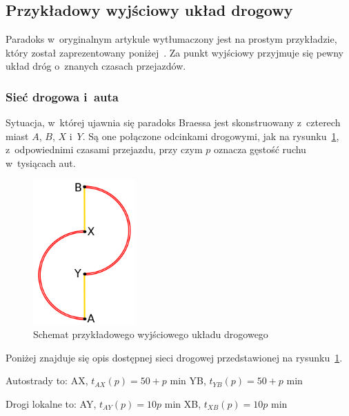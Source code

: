 \documentclass[twoside,12pt]{report}
\begin{document}
\subsection{Przykładowy wyjściowy układ drogowy}
Paradoks w~oryginalnym artykule wytłumaczony jest na prostym przykładzie, który został zaprezentowany poniżej~\cite{paradox,paradox-eng}. Za punkt wyjściowy przyjmuje się pewny układ dróg o~znanych czasach przejazdów.

\subsubsection{Sieć drogowa i~auta}
Sytuacja, w~której ujawnia się paradoks Braessa jest skonstruowany z~czterech miast $A$, $B$, $X$ i~$Y$. Są one połączone odcinkami drogowymi, jak na rysunku~\ref{fig:wyjsciowy_uklad_drogowy}, z~odpowiednimi czasami przejazdu, przy czym $p$ oznacza gęstość ruchu w~tysiącach aut.

\begin{figure}[htbp]
	\centering
	\includegraphics[width=0.35\textwidth]{img/braess1}
	\caption{Schemat przykładowego wyjściowego układu drogowego}
	\label{fig:wyjsciowy_uklad_drogowy}
\end{figure}

Poniżej znajduje się opis dostępnej sieci drogowej przedstawionej na rysunku~\ref{fig:wyjsciowy_uklad_drogowy}.

Autostrady to:\newline
AX, $t_{AX}(p) =  50 + p$ min\newline
YB, $t_{YB}(p) =  50 + p$ min\newline

Drogi lokalne to:\newline
AY, $t_{AY}(p) =  10p$ min\newline
XB, $t_{XB}(p) =  10p$ min\newline
\end{document}
